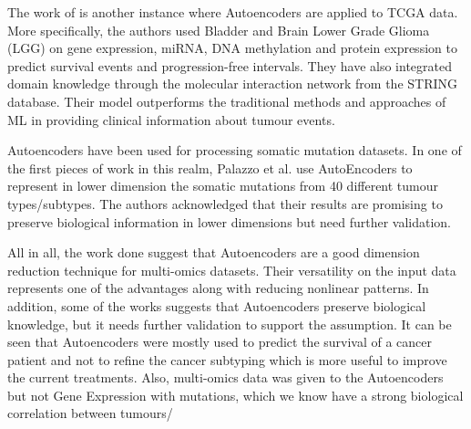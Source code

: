 The work of \citet{Ma2019-hk} is another instance where Autoencoders are applied to TCGA data. More specifically, the authors used Bladder and Brain Lower Grade Glioma (LGG) on gene expression, miRNA, DNA methylation and protein expression to predict survival events and progression-free intervals. They have also integrated domain knowledge through the molecular interaction network from the STRING database. Their model outperforms the traditional methods and approaches of ML in providing clinical information about tumour events.

Autoencoders have been used for processing somatic mutation datasets. In one of the first pieces of work in this realm, Palazzo et al. \cite{Palazzo2019-hx} use AutoEncoders to represent in lower dimension the somatic mutations from 40 different tumour types/subtypes. The authors acknowledged that their results are promising to preserve biological information in lower dimensions but need further validation.


All in all, the work done suggest that Autoencoders are a good dimension reduction technique for multi-omics datasets. Their versatility on the input data represents one of the advantages along with reducing nonlinear patterns. In addition, some of the works suggests that Autoencoders preserve biological knowledge, but it needs further validation to support the assumption. It can be seen that Autoencoders were mostly used to predict the survival of a cancer patient and not to refine the cancer subtyping which is more useful to improve the current treatments. Also, multi-omics data was given to the Autoencoders but not Gene Expression with mutations, which we know have a strong biological correlation between tumours/
